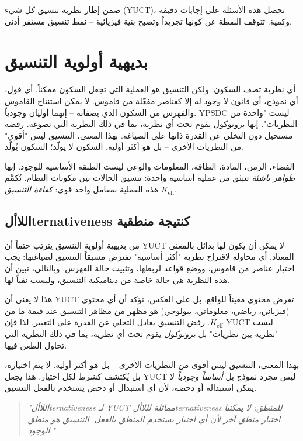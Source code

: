 \documentclass[12pt,a4paper]{article}
\newcommand{\Keff}{K_{\mathrm{eff}}}
\begin{document}
	ضمن إطار نظرية تنسيق كل شيء (YUCT)، تحصل هذه الأسئلة على إجابات دقيقة وكمية. تتوقف النقطة عن كونها تجريداً وتصبح بنية فيزيائية – نمط تنسيق مستقر أدنى.
	
	\section*{بديهية أولوية التنسيق}
	
	أي نظرية تصف السكون. ولكن التنسيق هو العملية التي تجعل السكون ممكناً. أي قول، أي نموذج، أي قانون لا وجود له إلا كعناصر مفعّلة من قاموس. لا يمكن استنتاج القاموس والفهرس من السكون الذي يصفانه – إنهما أوليان وجودياً. YPSDC ليست "واحدة من النظريات". إنها بروتوكول يقوم تحت أي نظرية، بما في ذلك النظرية التي تصوغه. رفضه مستحيل دون التخلي عن القدرة ذاتها على الصياغة. بهذا المعنى، التنسيق ليس "أقوى" من النظريات الأخرى – بل هو أكثر أولية. السكون لا يولّد؛ السكون يُولَّد.
	
	الفضاء، الزمن، المادة، الطاقة، المعلومات والوعي ليست الطبقة الأساسية للوجود. إنها \emph{ظواهر ناشئة} تنبثق من عملية أساسية واحدة: تنسيق الحالات بين مكونات النظام. تُكمَّم هذه العملية بمعامل واحد قوي: \emph{كفاءة التنسيق} \(\Keff\).
	
	\subsection*{اللاألternativeness كنتيجة منطقية}
	
	من بديهية أولوية التنسيق يترتب حتماً أن YUCT لا يمكن أن يكون لها بدائل بالمعنى المعتاد. أي محاولة لاقتراح نظرية "أكثر أساسية" تفترض مسبقاً التنسيق لصياغتها: يجب اختيار عناصر من قاموس، ووضع قواعد لربطها، وتثبيت حالة الفهرس. وبالتالي، تبين أن هذه النظرية هي حالة خاصة من ديناميكية التنسيق، وليست نفياً لها.
	
	هذا لا يعني أن YUCT تفرض محتوى معيناً للواقع. بل على العكس، تؤكد أن أي محتوى (فيزيائي، رياضي، معلوماتي، بيولوجي) هو مظهر من مظاهر التنسيق عند قيمة ما من \(\Keff\). رفض التنسيق يعادل التخلي عن القدرة على التعبير. لذا فإن YUCT ليست "نظرية بين نظريات" بل \emph{بروتوكول} يقوم تحت أي نظرية، بما في ذلك النظرية التي تحاول الطعن فيها.
	
	بهذا المعنى، التنسيق ليس أقوى من النظريات الأخرى – بل هو أكثر أولية. لا يتم اختياره، بل يُكتشف كشرط لكل اختيار. هذا يجعل YUCT ليس مجرد نموذج بل \emph{أساساً وجودياً} لا يمكن استبداله أو دحضه، لأن أي استبدال أو دحض يستخدم بالفعل التنسيق.
	
	\begin{quote}
		\itshape
		"اللاألternativeness لـ YUCT مماثلة لللاألternativeness للمنطق: لا يمكننا اختيار منطق آخر لأن أي اختيار يستخدم المنطق بالفعل. التنسيق هو منطق الوجود."
	\end{quote}
	
\end{document}
